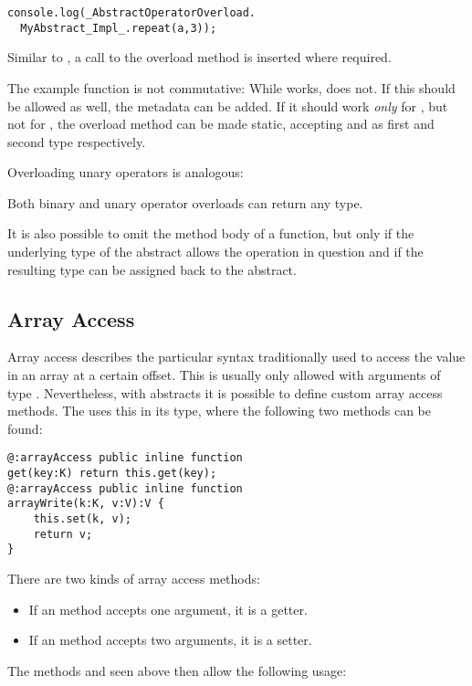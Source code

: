 \begin{lstlisting}
console.log(_AbstractOperatorOverload.
  MyAbstract_Impl_.repeat(a,3));
\end{lstlisting}
Similar to , a call to the overload method is inserted where required.

The example  function is not commutative: While  works,  does not. If this should be allowed as well, the  metadata can be added. If it should work \emph{only} for , but not for , the overload method can be made static, accepting  and  as first and second type respectively.

Overloading unary operators is analogous:

Both binary and unary operator overloads can return any type.

It is also possible to omit the method body of a  function, but only if the underlying type of the abstract allows the operation in question and if the resulting type can be assigned back to the abstract.


\subsection{Array Access}
\label{types-abstract-array-access}

Array access describes the particular syntax traditionally used to access the value in an array at a certain offset. This is usually only allowed with arguments of type . Nevertheless, with abstracts it is possible to define custom array access methods. The  uses this in its  type, where the following two methods can be found:

\begin{lstlisting}
@:arrayAccess public inline function
get(key:K) return this.get(key);
@:arrayAccess public inline function
arrayWrite(k:K, v:V):V {
	this.set(k, v);
	return v;
}
\end{lstlisting}
There are two kinds of array access methods:

\begin{itemize}
	\item If an  method accepts one argument, it is a getter.
	\item If an  method accepts two arguments, it is a setter.
\end{itemize}
The methods  and  seen above then allow the following usage:

